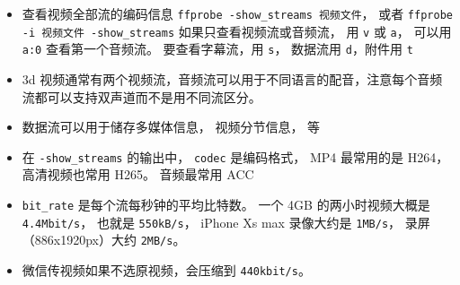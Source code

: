 
\begin{issues}
\issueDraft
\end{issues}

\begin{itemize}
\item 查看视频全部流的编码信息 \verb|ffprobe -show_streams 视频文件|， 或者 \verb|ffprobe -i 视频文件 -show_streams| 如果只查看视频流或音频流， 用 \verb|v| 或 \verb|a|， 可以用 \verb|a:0| 查看第一个音频流。 要查看字幕流，用 \verb|s|， 数据流用 \verb|d|，附件用 \verb|t|
\item 3d 视频通常有两个视频流，音频流可以用于不同语言的配音，注意每个音频流都可以支持双声道而不是用不同流区分。
\item 数据流可以用于储存多媒体信息， 视频分节信息， 等
\item 在 \verb|-show_streams| 的输出中， \verb|codec| 是编码格式， MP4 最常用的是 H264， 高清视频也常用 H265。 音频最常用 ACC
\item \verb|bit_rate| 是每个流每秒钟的平均比特数。 一个 4GB 的两小时视频大概是 \verb|4.4Mbit/s|， 也就是 \verb|550kB/s|， iPhone Xs max 录像大约是 \verb|1MB/s|， 录屏（886x1920px）大约 \verb|2MB/s|。
\item 微信传视频如果不选原视频，会压缩到 \verb|440kbit/s|。
\end{itemize}
